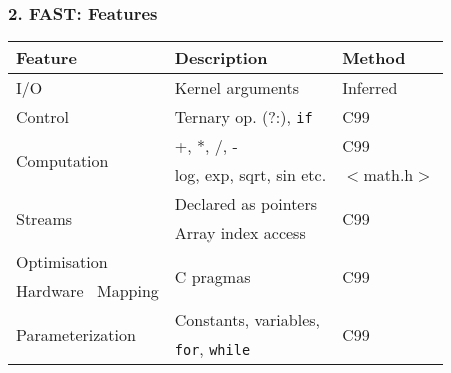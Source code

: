 \begin{frame}
  \frametitle{2. FAST: Features}

{\footnotesize
\begin{table}[!h]
  \centering
\renewcommand{\arraystretch}{1.5}
\begin{tabular}{l|l|l}
\hline
\bf{Feature}                        & \bf{Description}              & \bf{Method}          \\
\hline\hline
  I/O                               & Kernel arguments              & Inferred             \\
\hline
  Control                           & Ternary op. (?:), \texttt{if} & C99                  \\
\hline
\multirow{2}{*}{Computation}        & +, *, /, -                    & C99                  \\
                                    & log, exp, sqrt, sin etc.      & $<$math.h$>$         \\
\hline
  \multirow{2}{*}{Streams}          & Declared as pointers          & \multirow{2}{*}{C99} \\
                                    & Array index access     &                      \\
\hline
  Optimisation                      & \multirow{2}{*}{C pragmas}    & \multirow{2}{*}{C99} \\
  Hardware \  Mapping               &                               &                      \\
\hline
  \multirow{2}{*}{Parameterization} & Constants, variables,         & \multirow{2}{*}{C99} \\
                                    & \texttt{for}, \texttt{while}  &                      \\
\end{tabular}
\end{table}
}
\end{frame}

